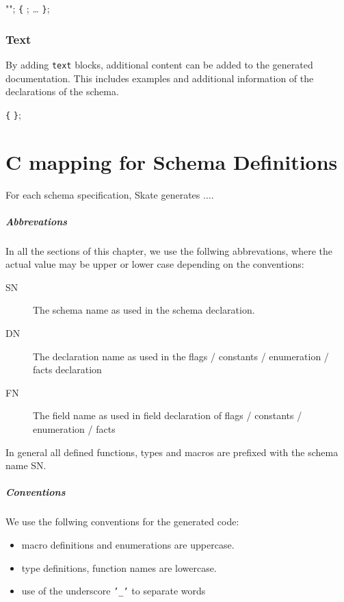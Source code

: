 \documentclass[a4paper,11pt,twoside]{report}
\begin{document}
{{\begin{syntax}
 "";  \verb+{+
    ;
    \ldots
\verb+}+;
    
\end{syntax}

\subsection{Text}
\label{sec:doc:text}

By adding \texttt{text} blocks, additional content can be added to the generated
documentation. This includes examples and additional information of the
declarations of the schema.

\begin{syntax}
 \verb+{+
\verb+}+; 
\end{syntax}

\chapter{C mapping for Schema Definitions}
\label{chap:cmapping}

For each schema specification, Skate generates ....

\paragraph{Abbrevations}
In all the sections of this chapter, we use the follwing abbrevations, where 
the actual value may be upper or lower case depending on the conventions:

\begin{description}
  \item[SN] The schema name as used in the schema declaration.
  \item[DN] The declaration name as used in the flags / constants / 
            enumeration / facts declaration
  \item[FN] The field name as used in field declaration of flags / constants / 
            enumeration / facts
\end{description}

In general all defined functions, types and macros are prefixed with the schema
name SN.

\paragraph{Conventions}
We use the follwing conventions for the generated code:
\begin{itemize}
  \item macro definitions and enumerations are uppercase.
  \item type definitions, function names are lowercase.
  \item use of the underscore \texttt{'\_'} to separate words
\end{itemize}

}}
\end{document}
